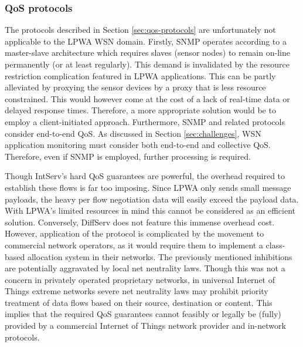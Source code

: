 \subsubsection{QoS protocols}
The protocols described in Section \ref{sec:qos-protocols} are unfortunately not applicable to the LPWA WSN domain. Firstly, SNMP operates according to a master-slave architecture which requires slaves (sensor nodes) to remain on-line permanently (or at least regularly)\cite{snmp_server_initiated}. This demand is invalidated by the resource restriction complication featured in LPWA applications. This can be partly alleviated by proxying the sensor devices by a proxy that is less resource constrained. This would however come at the cost of a lack of real-time data or delayed response times\cite{snmp_proxy}. Therefore, a more appropriate solution would be to employ a client-initiated approach. Furthermore, SNMP and related protocols consider end-to-end QoS. As discussed in Section \ref{sec:challenges}, WSN application monitoring must consider both end-to-end and collective QoS. Therefore, even if SNMP is employed, further processing is required.

Though IntServ's hard QoS guarantees are powerful, the overhead required to establish these flows is far too imposing\cite{intserv_diffserv_too_complex}. Since LPWA only sends small message payloads, the heavy per flow negotiation data will easily exceed the payload data. With LPWA's limited resources in mind this cannot be considered as an efficient solution. Conversely, DiffServ does not feature this immense overhead cost. However, application of the protocol is complicated by the movement to commercial network operators, as it would require them to implement a class-based allocation system in their networks. The previously mentioned inhibitions are potentially aggravated by local net neutrality laws. Though this was not a concern in privately operated proprietary networks, in universal Internet of Things extreme networks severe net neutrality laws may prohibit priority treatment of data flows based on their source, destination or content.\cite{net_neutrality} This implies that the required QoS guarantees cannot feasibly or legally be (fully) provided by a commercial Internet of Things network provider and in-network protocols. 


